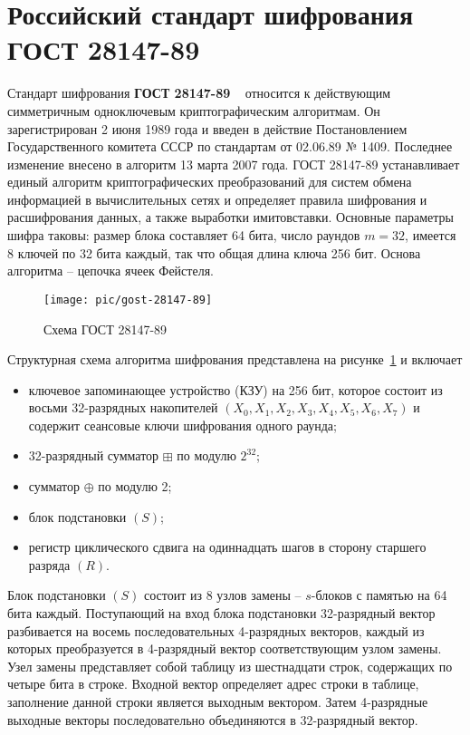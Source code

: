\section{Российский стандарт шифрования ГОСТ 28147-89}

Стандарт шифрования \textbf{ГОСТ 28147-89} ~\cite{GOST-89} относится к действующим симметричным одноключевым криптографическим алгоритмам. Он зарегистрирован 2 июня 1989 года и введен в действие Постановлением Государственного комитета СССР по стандартам от 02.06.89 № 1409.
Последнее изменение внесено в алгоритм 13 марта 2007 года.
ГОСТ 28147-89 устанавливает единый алгоритм криптографических преобразований для систем обмена информацией в вычислительных сетях и определяет правила шифрования и расшифрования данных, а также выработки имитовставки. Основные параметры шифра таковы: размер блока составляет 64 бита, число раундов $m=32$, имеется 8 ключей по 32 бита каждый, так что общая длина ключа 256 бит. Основа алгоритма -- цепочка ячеек Фейстеля.

\begin{figure}[!ht]
    \centering
    \texttt{[image: pic/gost-28147-89]}
    \caption{Схема ГОСТ 28147-89\label{fig:gost-28147-89}}
\end{figure}

Структурная схема алгоритма шифрования представлена на рисунке~\ref{fig:gost-28147-89} и включает
\begin{itemize}
    \item ключевое запоминающее устройство (КЗУ) на 256 бит, которое состоит из восьми 32-разрядных накопителей $(X_0, X_1, X_2, X_3, X_4, X_5, X_6, X_7)$ и содержит сеансовые ключи шифрования одного раунда;
    \item 32-разрядный сумматор $\boxplus$ по модулю $2^{32}$;
    \item сумматор $\oplus$ по модулю 2;
    \item блок подстановки $(S)$;
    \item регистр циклического сдвига на одиннадцать шагов в сторону старшего разряда  $(R)$.
\end{itemize}

Блок подстановки $(S)$ состоит из 8 узлов замены -- $s$-блоков с памятью на 64 бита каждый. Поступающий на вход блока подстановки 32-разрядный вектор разбивается на восемь последовательных 4-разрядных векторов, каждый из которых преобразуется в 4-разрядный вектор соответствующим узлом замены. Узел замены представляет собой таблицу из шестнадцати строк, содержащих по четыре бита в строке. Входной вектор определяет адрес строки в таблице, заполнение данной строки является выходным вектором. Затем 4-разрядные выходные векторы последовательно объединяются в 32-разрядный вектор.


